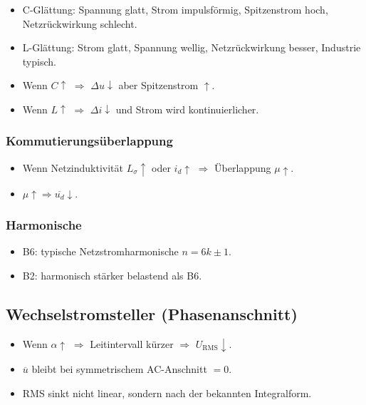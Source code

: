 \begin{itemize}
\item C-Glättung: Spannung glatt, Strom impulsförmig, Spitzenstrom hoch, Netzrückwirkung schlecht.
\item L-Glättung: Strom glatt, Spannung wellig, Netzrückwirkung besser, Industrie typisch.
\item Wenn $C\uparrow$ $\Rightarrow$ $\Delta u \downarrow$ aber Spitzenstrom $\uparrow$.
\item Wenn $L\uparrow$ $\Rightarrow$ $\Delta i \downarrow$ und Strom wird kontinuierlicher.
\end{itemize}

\subsubsection{Kommutierungsüberlappung}

\begin{itemize}
\item Wenn Netzinduktivität $L_\sigma\uparrow$ oder $i_d\uparrow$ $\Rightarrow$ Überlappung $\mu\uparrow$.
\item $\mu\uparrow \Rightarrow \overline{u_d}\downarrow$.
\end{itemize}

\subsubsection{Harmonische}

\begin{itemize}
\item B6: typische Netzstromharmonische $n=6k\pm 1$.
\item B2: harmonisch stärker belastend als B6.
\end{itemize}

\subsection{Wechselstromsteller (Phasenanschnitt)}

\begin{itemize}
\item Wenn $\alpha\uparrow$ $\Rightarrow$ Leitintervall kürzer $\Rightarrow$ $U_{\mathrm{RMS}}\downarrow$.
\item $\overline{u}$ bleibt bei symmetrischem AC-Anschnitt $=0$.
\item RMS sinkt nicht linear, sondern nach der bekannten Integralform.
\end{itemize}


